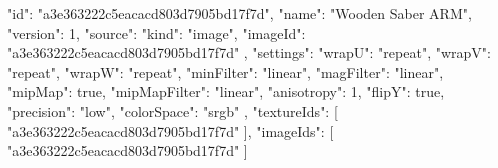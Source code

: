 {
  "id": "a3e363222c5eacacd803d7905bd17f7d",
  "name": "Wooden Saber ARM",
  "version": 1,
  "source": {
    "kind": "image",
    "imageId": "a3e363222c5eacacd803d7905bd17f7d"
  },
  "settings": {
    "wrapU": "repeat",
    "wrapV": "repeat",
    "wrapW": "repeat",
    "minFilter": "linear",
    "magFilter": "linear",
    "mipMap": true,
    "mipMapFilter": "linear",
    "anisotropy": 1,
    "flipY": true,
    "precision": "low",
    "colorSpace": "srgb"
  },
  "textureIds": [
    "a3e363222c5eacacd803d7905bd17f7d"
  ],
  "imageIds": [
    "a3e363222c5eacacd803d7905bd17f7d"
  ]
}

